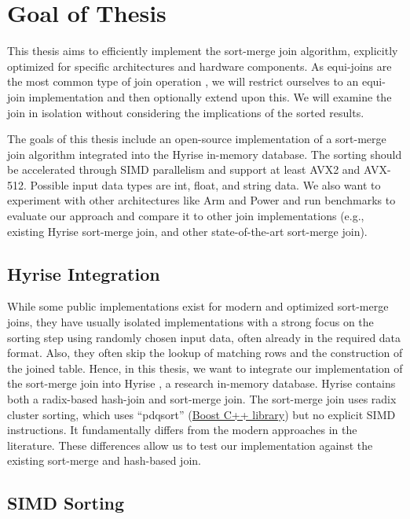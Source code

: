 \section{Goal of Thesis}
\label{sec:goal}

This thesis aims to efficiently implement the sort-merge join algorithm, explicitly optimized 
for specific architectures and hardware components. As equi-joins are the most common type of 
join operation \cite{DBLP:conf/cloud/BlanasP13}, we will restrict ourselves to an equi-join implementation and then optionally
extend upon this. We will examine the join in isolation without considering the implications of the sorted results.

The goals of this thesis include an open-source implementation of a sort-merge join algorithm
integrated into the Hyrise in-memory database. The sorting should be accelerated through SIMD
parallelism and support at least AVX2 and AVX-512. Possible input data types are int, float, and string
data. We also want to experiment with other architectures like Arm and Power and run benchmarks to
evaluate our approach and compare it to other join implementations
(e.g., existing Hyrise sort-merge join, and other state-of-the-art sort-merge join).

\subsection{Hyrise Integration}
While some public implementations
exist for modern and optimized sort-merge joins, they have usually isolated implementations with a strong
focus on the sorting step using randomly chosen input data, often already in the required data format. 
Also, they often skip the lookup of matching rows and the construction of the joined table.
Hence, in this thesis, we want to integrate our implementation of the sort-merge join into Hyrise
\cite{DBLP:conf/edbt/DreselerK0KUP19},
a research in-memory database. Hyrise contains both a radix-based hash-join and sort-merge join.
The sort-merge join uses radix cluster sorting, which uses ``pdqsort'' (\href{https://www.boost.org/}{Boost C++ library})
but no explicit SIMD instructions. It fundamentally differs from the modern approaches in the literature.
These differences allow us to test our implementation against the existing sort-merge and hash-based join.

\subsection{SIMD Sorting}

